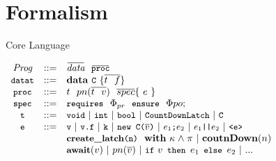 \section{Formalism}
\begin{frame}{Core Language}
  \begin{center}
  \begin{small}
  $
  \begin{array}{cll}
    \nonterm{Prog} & ::= & \overbar{\nonterm{data}} ~~ \overbar{\code{proc}}\\
    \code{datat} & ::= & {\bf data} ~ \code{C} ~\{\overline{t~ ~ f}  \} \\
    \code{proc} & ::= & t ~~ pn(\overline{t ~~ v}) ~~\overline{spec}\{~e~\} \\
    \code{spec} & ::= & \code{requires} ~~ \Phi_{pr} ~~ \code{ensure} ~~
    \Phi{po} ; \\
    \code{t} & ::= & \code{void} ~|~ \code{int} ~|~ \code{bool} ~|~ \code{\CDL}
    ~|~ \code{C} \\
    \code{e} & ::= & \code{v} ~|~ \code{v.f} ~|~ \code{k} ~|~
    \code{new~C($\overline{v}$)} ~|~ \code{$e_1$;$e_2$} ~|~ \code{$e_1$||$e_2$} ~|~
    \code{<e>}  \\
    ~ & ~ & \code{{\bf create\_latch}(n)} ~~ {\bf with} ~ \kappa \land \pi ~|~
         {\bf coutnDown}(n) \\
    ~ & ~ & \code{\bf await}(v) ~|~ pn(\overline{v}) ~|~ \code{if}~ v \code{
           then } e_1 \code{ else } e_2 ~|~ ...
  \end{array}
  $
  \end{small}
  \end{center}
\end{frame}


